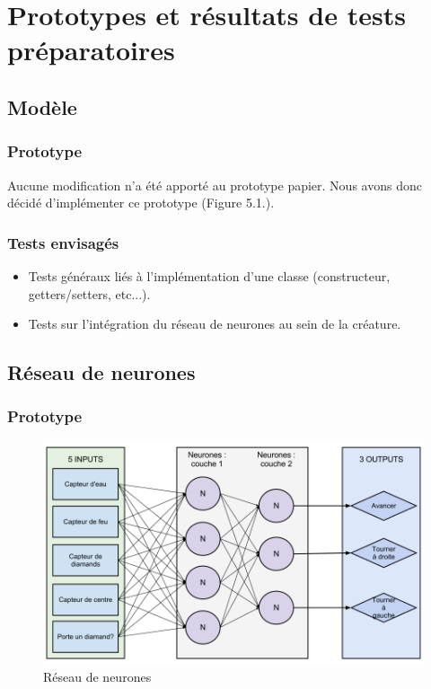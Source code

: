 \chapter{Prototypes et résultats de tests préparatoires}


\section{Modèle}
\subsection{Prototype}
Aucune modification n'a été apporté au prototype papier. Nous avons donc décidé d'implémenter ce prototype (Figure 5.1.).



\subsection{Tests envisagés}
\begin{itemize}
  \item Tests généraux liés à l'implémentation d'une classe (constructeur, getters/setters, etc...).
  \item  Tests sur l'intégration du réseau de neurones au sein de la créature.\\

\end{itemize}


\section{Réseau de neurones}
\subsection{Prototype}
\begin{figure}[H]
    \centering
    \includegraphics[width=1\textwidth]{./pictures/notre_reseau_neurones.png}
    \caption{Réseau de neurones}
\end{figure}


